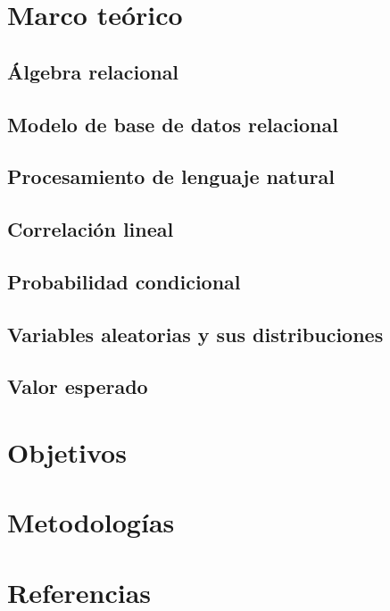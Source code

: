 \documentclass[12pt,letterpaper]{article}
\begin{document}
  
%
\tableofcontents
\pagebreak
\section {Marco teórico}\label{sec:marcot}
\subsection {Álgebra relacional}\label{subsec:algebra}
\subsection {Modelo de base de datos relacional}\label{subsch:rdb}
\subsection {Procesamiento de lenguaje natural}\label{subsec:nlp}
\subsection {Correlación lineal}\label{subsec:corrl}
\subsection {Probabilidad condicional}\label{subsec:pcond}
\subsection {Variables aleatorias y sus distribuciones}\label{subsec:vayd}
\subsection {Valor esperado}\label{subsec:valesp}
\section {Objetivos}\label{sec:objetivos}
\section {Metodologías}\label{sec:metod}
\section {Referencias}\label{sec:refs}\printbibliography[heading=none]
\end{document}
